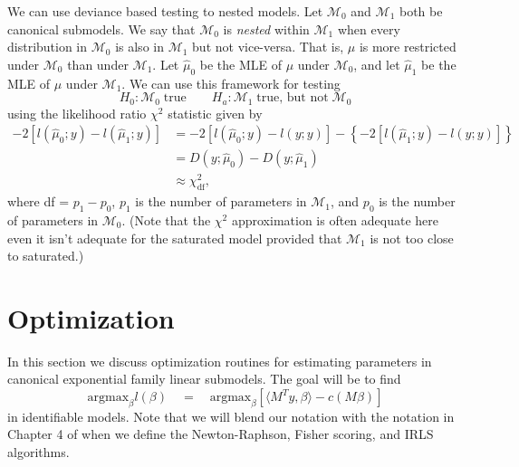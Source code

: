 \documentclass[12pt]{article}
\newcommand{\inner}[1]{\langle #1 \rangle}
\begin{document}
\vspace*{0.5cm} We can use deviance based testing to nested models. Let $\mathcal{M}_0$ and $\mathcal{M}_1$ both be canonical submodels. We say that $\mathcal{M}_0$ is \emph{nested} within $\mathcal{M}_1$  when every distribution in $\mathcal{M}_0$ is also in $\mathcal{M}_1$ but not vice-versa. That is, $\mu$ is more restricted under $\mathcal{M}_0$ than under $\mathcal{M}_1$. Let $\hat\mu_0$ be the MLE of $\mu$ under $\mathcal{M}_0$, and let $\hat\mu_1$ be the MLE of $\mu$ under $\mathcal{M}_1$. We can use this framework for testing
$$
  H_0:\mathcal{M}_0 \; \text{true} \qquad H_a:\mathcal{M}_1 \; \text{true, but not} \; \mathcal{M}_0
$$
using the likelihood ratio $\chi^2$ statistic given by 
\begin{align*}
 -2\left[l(\hat\mu_0;y) - l(\hat\mu_1;y)\right] &= -2\left[l(\hat\mu_0;y) - l(y;y)\right] 
   - \left\{-2\left[l(\hat\mu_1;y) - l(y;y)\right]\right\} \\
   &= D(y;\hat\mu_0) - D(y;\hat\mu_1) \\ 
   &\approx \chi^2_{\text{df}},	
\end{align*}
where df = $p_1 - p_0$, $p_1$ is the number of parameters in $\mathcal{M}_1$, and $p_0$ is the number of parameters in $\mathcal{M}_0$. (Note that the $\chi^2$ approximation is often adequate here even it isn't adequate for the saturated model provided that $\mathcal{M}_1$ is not too close to saturated.)






\section*{Optimization}

In this section we discuss optimization routines for estimating parameters in canonical exponential family linear submodels. The goal will be to find 
\begin{equation} \label{optim}
  \text{argmax}_{\beta} l(\beta) 
    \quad = \quad \text{argmax}_{\beta}\left[\inner{M^Ty,\beta} - c(M\beta)\right]
\end{equation}
in identifiable models. Note that we will blend our notation with the notation in Chapter 4 of \cite{agresti2013cat} when we define the Newton-Raphson, Fisher scoring, and IRLS algorithms.
\end{document}
